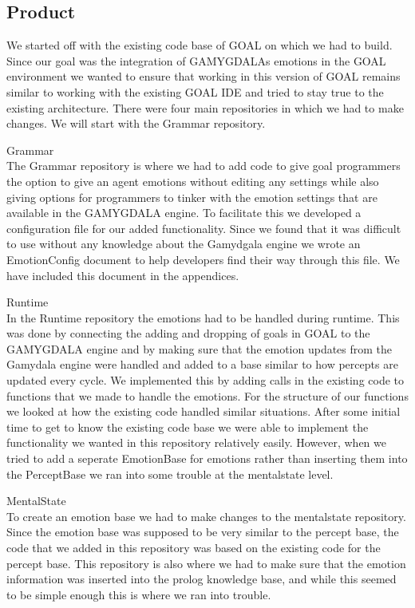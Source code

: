 \documentclass[11pt]{article}
\begin{document}
\subsection{Product}
We started off with the existing code base of GOAL\cite{GOAL} on which we had to build. Since our goal was the integration of GAMYGDALAs emotions in the GOAL environment\cite{GOAL Env} we wanted to ensure that working in this version of GOAL remains similar to working with the existing GOAL IDE and tried to stay true to the existing architecture. There were four main repositories in which we had to make changes. We will start with the Grammar repository.\par
Grammar\\
The Grammar repository is where we had to add code to give goal programmers the option to give an agent emotions without editing any settings while also giving options for programmers to tinker with the emotion settings that are available in the GAMYGDALA engine. To facilitate this we developed a configuration file for our added functionality. Since we found that it was difficult to use without any knowledge about the Gamydgala engine we wrote an EmotionConfig document to help developers find their way through this file. We have included this document in the appendices. \par
Runtime\\ 
In the Runtime repository the emotions had to be handled during runtime. This was done by connecting the adding and dropping of goals in GOAL to the GAMYGDALA engine and by making sure that the emotion updates from the Gamydala engine were handled and added to a base similar to how percepts are updated every cycle. We implemented this by adding calls in the existing code to functions that we made to handle the emotions. For the structure of our functions we looked at how the existing code handled similar situations. After some initial time to get to know the existing code base we were able to implement the functionality we wanted in this repository relatively easily. However, when we tried to add a seperate EmotionBase for emotions rather than inserting them into the PerceptBase we ran into some trouble at the mentalstate level. \par 
MentalState\\
To create an emotion base we had to make changes to the mentalstate repository. Since the emotion base was supposed to be very similar to the percept base, the code that we added in this repository was based on the existing code for the percept base. This repository is also where we had to make sure that the emotion information was inserted into the prolog knowledge base, and while this seemed to be simple enough this is where we ran into trouble. \par 
\end{document}
